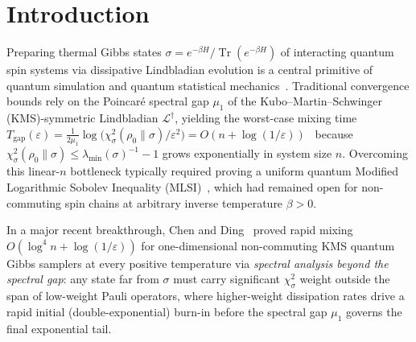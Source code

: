 \documentclass[11pt,a4paper]{article}
\theoremstyle{definition}
\newcommand{\Q}{\mathbb{Q}}
\newcommand{\Tr}{\operatorname{Tr}}
\begin{document}
\begin{abstract}
floating-point input). All 16 core algebraic theorems are formalized in Lean~4 (\texttt{v4.35.0}, 0 \texttt{sorry}, 0 \texttt{Classical.choice}) and benchmarked on non-commuting 1D tilted/ferromagnetic TFIM ($1.26\times$--$3.30\times$ speedup for $n=3, 4$; $1.65\times$--$3.30\times$ at $n=4$) and XXZ ($1.57\times$) KMS Gibbs samplers, $n = 10$--$1{,}000$ depolarizing chains ($17.7\times$ universal $c=3$ and $20.7\times$ product-state $c=1$ speedup), and 6 exact-$\Q$ certificates containing 14 verified linked $\mathrm{LDL}^\top$ PSD witnesses.
\end{abstract}

\section{Introduction}
\label{sec:intro}

Preparing thermal Gibbs states $\sigma = e^{-\beta H}/\Tr(e^{-\beta H})$ of interacting quantum spin systems via dissipative Lindbladian evolution is a central primitive of quantum simulation and quantum statistical mechanics~\cite{Davies1979Generators,ChenKastoryanoGilyen2023,BardetCapelGaoLuciaPerezGarciaRouze2023}. Traditional convergence bounds rely on the Poincaré spectral gap $\mu_1$ of the Kubo--Martin--Schwinger (KMS)-symmetric Lindbladian $\mathcal{L}^\dagger$, yielding the worst-case mixing time $T_{\mathrm{gap}}(\varepsilon) = \frac{1}{2\mu_1}\log\bigl(\chi^2_\sigma(\rho_0\|\sigma)/\varepsilon^2\bigr) = O(n + \log(1/\varepsilon))$~\cite{Temme2010Chi2} because $\chi^2_\sigma(\rho_0\|\sigma) \le \lambda_{\min}(\sigma)^{-1} - 1$ grows exponentially in system size $n$. Overcoming this linear-$n$ bottleneck typically required proving a uniform quantum Modified Logarithmic Sobolev Inequality (MLSI)~\cite{KastoryanoTemme2013QMLSI}, which had remained open for non-commuting spin chains at arbitrary inverse temperature $\beta > 0$.

In a major recent breakthrough, Chen and Ding~\cite{ChenDing2026BeyondGap} proved rapid mixing $O(\log^4 n + \log(1/\varepsilon))$ for one-dimensional non-commuting KMS quantum Gibbs samplers at every positive temperature via \emph{spectral analysis beyond the spectral gap}: any state far from $\sigma$ must carry significant $\chi^2_\sigma$ weight outside the span of low-weight Pauli operators, where higher-weight dissipation rates drive a rapid initial (double-exponential) burn-in before the spectral gap $\mu_1$ governs the final exponential tail.
\end{document}
